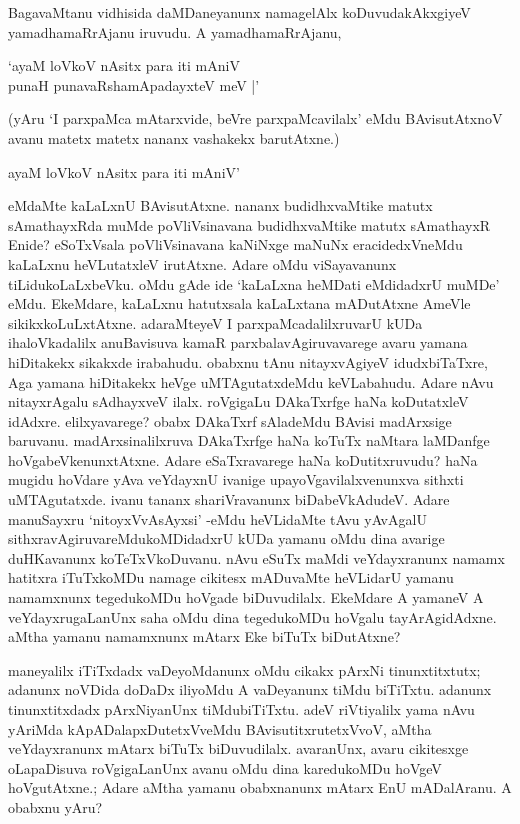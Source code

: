 BagavaMtanu vidhisida daMDaneyanunx namagelAlx koDuvudakAkxgiyeV yamadhamaRrAjanu iruvudu. A yamadhamaRrAjanu,

\begin{shloka}
`ayaM loVkoV nAsitx para iti mAniV\\
punaH punavaRshamApadayxteV meV |'
\end{shloka}

(yAru `I parxpaMca mAtarxvide, beVre parxpaMcavilalx' eMdu BAvisutAtxnoV avanu matetx matetx nananx vashakekx barutAtxne.)

\begin{shloka}
ayaM loVkoV nAsitx para iti mAniV'
\end{shloka}

\noindent eMdaMte kaLaLxnU BAvisutAtxne. nananx budidhxvaMtike matutx sAmathayxRda muMde poVliVsinavana budidhxvaMtike matutx sAmathayxR Enide? eSoTxVsala poVliVsinavana kaNiNxge maNuNx eracidedxVneMdu kaLaLxnu heVLutatxleV irutAtxne. Adare oMdu viSayavanunx tiLidukoLaLxbeVku. oMdu gAde ide `kaLaLxna heMDati eMdidadxrU muMDe' eMdu. EkeMdare, kaLaLxnu hatutxsala kaLaLxtana mADutAtxne AmeVle sikikxkoLuLxtAtxne. adaraMteyeV I parxpaMcadalilxruvarU kUDa ihaloVkadalilx anuBavisuva kamaR parxbalavAgiruvavarege avaru yamana hiDitakekx sikakxde irabahudu. obabxnu tAnu nitayxvAgiyeV idudxbiTaTxre, Aga yamana hiDitakekx heVge uMTAgutatxdeMdu keVLabahudu. Adare nAvu nitayxrAgalu sAdhayxveV ilalx. roVgigaLu DAkaTxrfge haNa koDutatxleV idAdxre. elilxyavarege? obabx DAkaTxrf sAladeMdu BAvisi madArxsige baruvanu. madArxsinalilxruva DAkaTxrfge haNa koTuTx naMtara laMDanfge hoVgabeVkenunxtAtxne. Adare eSaTxravarege haNa koDutitxruvudu? haNa mugidu hoVdare yAva veYdayxnU ivanige upayoVgavilalxvenunxva sithxti uMTAgutatxde. ivanu tananx shariVravanunx biDabeVkAdudeV. Adare manuSayxru `nitoyxVvAsAyxsi' -eMdu heVLidaMte tAvu yAvAgalU sithxravAgiruvareMdukoMDidadxrU kUDa yamanu oMdu dina avarige duHKavanunx koTeTxVkoDuvanu. nAvu eSuTx maMdi veYdayxranunx namamx hatitxra iTuTxkoMDu namage cikitesx mADuvaMte heVLidarU yamanu namamxnunx tegedukoMDu hoVgade biDuvudilalx. EkeMdare A yamaneV A veYdayxrugaLanUnx saha oMdu dina tegedukoMDu hoVgalu tayArAgidAdxne. aMtha yamanu namamxnunx mAtarx Eke biTuTx biDutAtxne?

maneyalilx iTiTxdadx vaDeyoMdanunx oMdu cikakx pArxNi tinunxtitxtutx; adanunx noVDida doDaDx iliyoMdu A vaDeyanunx tiMdu biTiTxtu. adanunx tinunxtitxdadx pArxNiyanUnx tiMdubiTiTxtu. adeV riVtiyalilx yama nAvu yAriMda kApADalapxDutetxVveMdu BAvisutitxrutetxVvoV, aMtha veYdayxranunx mAtarx biTuTx biDuvudilalx. avaranUnx, avaru cikitesxge oLapaDisuva roVgigaLanUnx avanu oMdu dina karedukoMDu hoVgeV hoVgutAtxne.; Adare aMtha yamanu obabxnanunx mAtarx EnU mADalAranu. A obabxnu yAru?

